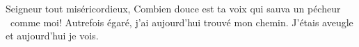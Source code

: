Seigneur tout miséricordieux,
Combien douce est ta voix
qui sauva un pécheur  comme moi!
Autrefois égaré,
j'ai aujourd'hui trouvé mon chemin.
J'étais aveugle et aujourd'hui je vois.
